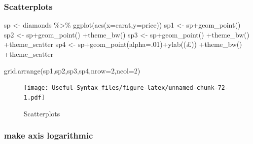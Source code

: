 \documentclass[
]{article}
\newenvironment{Shaded}{\begin{snugshade}}{\end{snugshade}}
\newcommand{\AttributeTok}[1]{\textcolor[rgb]{0.77,0.63,0.00}{#1}}
\newcommand{\DecValTok}[1]{\textcolor[rgb]{0.00,0.00,0.81}{#1}}
\newcommand{\FunctionTok}[1]{\textcolor[rgb]{0.00,0.00,0.00}{#1}}
\newcommand{\NormalTok}[1]{#1}
\newcommand{\OtherTok}[1]{\textcolor[rgb]{0.56,0.35,0.01}{#1}}
\newcommand{\SpecialCharTok}[1]{\textcolor[rgb]{0.00,0.00,0.00}{#1}}
\newcommand{\StringTok}[1]{\textcolor[rgb]{0.31,0.60,0.02}{#1}}
\begin{document}
\hypertarget{scatterplots}{%
\subsubsection{Scatterplots}\label{scatterplots}}

\begin{Shaded}
\begin{Highlighting}[]
\NormalTok{sp }\OtherTok{\textless{}{-}}\NormalTok{ diamonds }\SpecialCharTok{\%\textgreater{}\%} \FunctionTok{ggplot}\NormalTok{(}\FunctionTok{aes}\NormalTok{(}\AttributeTok{x=}\NormalTok{carat,}\AttributeTok{y=}\NormalTok{price))}
\NormalTok{sp1 }\OtherTok{\textless{}{-}}\NormalTok{ sp}\SpecialCharTok{+}\FunctionTok{geom\_point}\NormalTok{()}
\NormalTok{sp2 }\OtherTok{\textless{}{-}}\NormalTok{ sp}\SpecialCharTok{+}\FunctionTok{geom\_point}\NormalTok{() }\SpecialCharTok{+}\FunctionTok{theme\_bw}\NormalTok{()}
\NormalTok{sp3 }\OtherTok{\textless{}{-}}\NormalTok{ sp}\SpecialCharTok{+}\FunctionTok{geom\_point}\NormalTok{() }\SpecialCharTok{+}\FunctionTok{theme\_bw}\NormalTok{() }\SpecialCharTok{+}\NormalTok{theme\_scatter}
\NormalTok{sp4 }\OtherTok{\textless{}{-}}\NormalTok{ sp}\SpecialCharTok{+}\FunctionTok{geom\_point}\NormalTok{(}\AttributeTok{alpha=}\NormalTok{.}\DecValTok{01}\NormalTok{)}\SpecialCharTok{+}\FunctionTok{ylab}\NormalTok{(}\StringTok{\textquotesingle{}(£)\textquotesingle{}}\NormalTok{) }\SpecialCharTok{+}\FunctionTok{theme\_bw}\NormalTok{() }\SpecialCharTok{+}\NormalTok{theme\_scatter}


\FunctionTok{grid.arrange}\NormalTok{(sp1,sp2,sp3,sp4,}\AttributeTok{nrow=}\DecValTok{2}\NormalTok{,}\AttributeTok{ncol=}\DecValTok{2}\NormalTok{)}
\end{Highlighting}
\end{Shaded}

\begin{figure}
\centering
\texttt{[image: Useful-Syntax\_files/figure-latex/unnamed-chunk-72-1.pdf]}
\caption{\label{fig:unnamed-chunk-72}Scatterplots}
\end{figure}

\hypertarget{make-axis-logarithmic}{%
\subsubsection{make axis logarithmic}\label{make-axis-logarithmic}}
\end{document}
